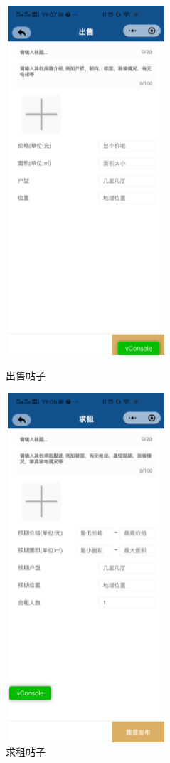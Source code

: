 \begin{figure}[htbp]
    \centering
    \begin{minipage}[t]{0.48\textwidth}
    \centering
    \includegraphics[width=6cm,height=13cm]{design/image/fabu2.png} 
    \caption{出售帖子}
    \end{minipage}
    \begin{minipage}[t]{0.48\textwidth}
    \centering
    \includegraphics[width=6cm,height=13cm]{design/image/fabu3.png}
    \caption{求租帖子}
    \end{minipage}
    \end{figure}

